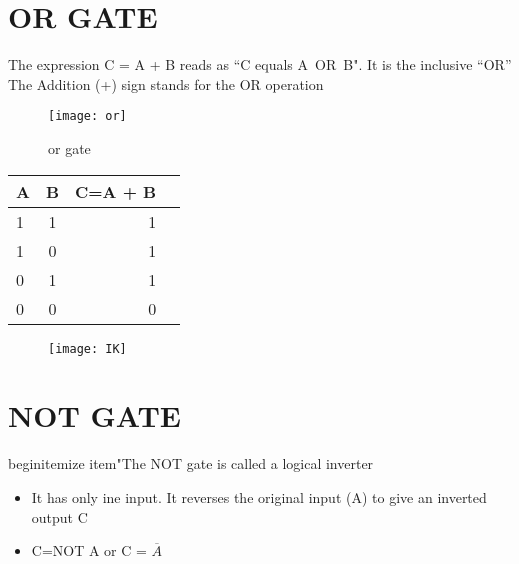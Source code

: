 \documentclass{article}
\begin{document}
\section{OR GATE}
The expression C = A + B reads as “C equals A OR B". It is the inclusive “OR”
The Addition (+) sign stands for the OR operation

	\begin{figure}[h!]
	\texttt{[image: or]}
	\caption{or gate}
\end{figure}
\begin{table}[h!]
	\begin{center}
		\begin{tabular}{|l|c|r|c|}
			\cellcolor{blue!35}\textbf{A} & \cellcolor{blue!35}\textbf{B} & \cellcolor{blue!35}\textbf{C=A + B}\\
			\hline
			\cellcolor{blue!15}	1 & \cellcolor{blue!15}1 & \cellcolor{blue!15}1\\
			\cellcolor{blue!15}	1 & \cellcolor{blue!15} 0 & \cellcolor{blue!15}1\\
			\cellcolor{blue!15}	0 & \cellcolor{blue!15}1 & \cellcolor{blue!15} 1\\
			\cellcolor{blue!15}	0 & \cellcolor{blue!15}0 & \cellcolor{blue!15}0\\
			\hline	
		\end{tabular}
	\end{center}
\end{table}

\begin{figure}[h!]
\texttt{[image: IK]}

\end{figure}


\section{NOT GATE}
begin{itemize}
item"{The NOT gate is called a logical inverter}

\begin{itemize}
\item{It has only ine input. It reverses the original input (A) to give an inverted output C}

\item C=NOT A or C = $\overline{A}$

\end{itemize}
\end{document}
